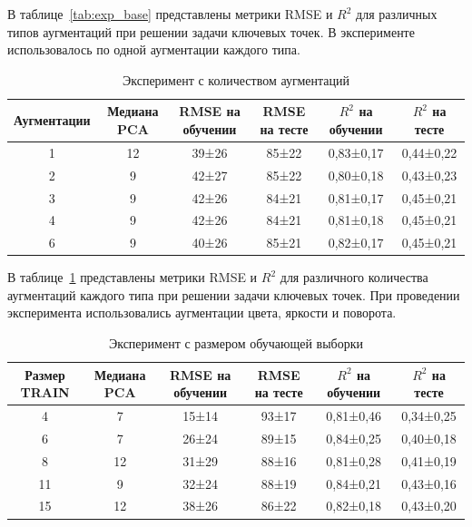 \documentclass[a4paper,14pt]{article}
\begin{document}
\begin{landscape}
\begin{table}[H]
    \end{table}

	В таблице~\ref{tab:exp_base}  представлены метрики RMSE и $R^2$ для различных типов аугментаций при решении задачи ключевых точек. 
	В эксперименте использовалось по одной аугментации каждого типа.

    \begin{table}[H]
        \centering
        \caption{Эксперимент с количеством аугментаций}
        \label{tab:exp_4}

        \begin{tabular}{cccccc}
            \toprule
            Аугментации & Медиана PCA &  RMSE на обучении  & RMSE на тесте & $R^2$ на обучении & $R^2$ на тесте  \\
            \midrule
            1        & 12           &  39±26       & 85±22      & 0,83±0,17 & 0,44±0,22 \\
            2        & 9            &  42±27       & 85±22      & 0,80±0,18 & 0,43±0,23 \\
            3        & 9            &  42±26       & 84±21      & 0,81±0,17 & 0,45±0,21 \\
            4        & 9            &  42±26       & 84±21      & 0,81±0,18 & 0,45±0,21 \\
            6        & 9            &  40±26       & 85±21      & 0,82±0,17 & 0,45±0,21 \\
            \bottomrule
        \end{tabular}

    \end{table}

   	В таблице~\ref{tab:exp_4}  представлены метрики RMSE и $R^2$ для различного количества аугментаций каждого типа при решении задачи ключевых точек. 
   	При проведении эксперимента использовались аугментации цвета, яркости и поворота.

    \begin{table}[H]
        \centering
        \caption{Эксперимент с размером обучающей выборки}
        \label{tab:exp_5}

        \begin{tabular}{cccccc}
            \toprule
            Размер TRAIN & Медиана PCA &  RMSE на обучении  & RMSE на тесте & $R^2$ на обучении & $R^2$ на тесте  \\
            \midrule
            4           & 7            & 15±14       & 93±17      & 0,81±0,46 & 0,34±0,25 \\
            6           & 7            & 26±24       & 89±15      & 0,84±0,25 & 0,40±0,18 \\
            8           & 12           & 31±29       & 88±16      & 0,81±0,28 & 0,41±0,19 \\
            11          & 9            & 32±24       & 88±19      & 0,84±0,21 & 0,43±0,16 \\
            15          & 12           & 38±26       & 86±22      & 0,82±0,18 & 0,43±0,20 \\
            \bottomrule
        \end{tabular}


\end{table}
\end{landscape}
\end{document}
